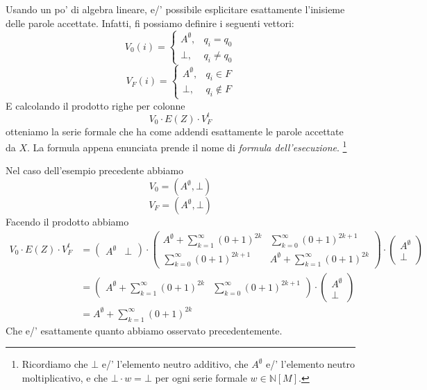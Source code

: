 Usando un po' di algebra lineare,
e/' possibile esplicitare esattamente l'inisieme delle parole accettate.
Infatti, fi possiamo definire i seguenti vettori:
\[
V_0(i)=
\left\{
\begin{matrix}
    A^\emptyset,  & q_i=q_0 
    \\
    \bot, & q_i\neq q_0 
\end{matrix}
\right.
\]
\[
V_F(i)=
\left\{
\begin{matrix}
    A^\emptyset,  & q_i \in F
    \\
    \bot, & q_i\notin F
\end{matrix}
\right.
\]
E calcolando il prodotto righe per colonne
\[
V_0 \cdot E(Z) \cdot V_F^t
\]
otteniamo la serie formale che ha come addendi esattamente le parole accettate da $X$.
La formula appena enunciata prende il nome di \textit{formula dell'esecuzione}.
\footnote{Ricordiamo che $\bot$ e/' l'elemento neutro additivo, 
che $A^\emptyset$ e/' l'elemento neutro moltiplicativo,
e che $\bot \cdot w = \bot$ per ogni serie formale $w \in \mathbb N[M]$.
}
\begin{exam}
    Nel caso dell'esempio precedente abbiamo
    \[
    V_0=(A^\emptyset, \bot)
    \]
    \[
    V_F=(A^\emptyset, \bot)
    \]
    Facendo il prodotto abbiamo
    \begin{align*}
        V_0 \cdot E(Z) \cdot V_F^t
        &=
        \begin{pmatrix}
              A^\emptyset & \bot    
        \end{pmatrix}
        \cdot 
        \begin{pmatrix}
        A^\emptyset + \sum_{k =1}^{\infty}(0+1)^{2k} & \sum_{k =0}^{\infty}(0+1)^{2k+1}
        \\
        \sum_{k =0}^{\infty}(0+1)^{2k+1} &  A^\emptyset + \sum_{k =1}^{\infty}(0+1)^{2k} 
    \end{pmatrix}
        \cdot
        \begin{pmatrix}
            A^\emptyset
            \\
            \bot
        \end{pmatrix}
        \\
        &=
        \begin{pmatrix}
            A^\emptyset + \sum_{k =1}^{\infty}(0+1)^{2k}
            &
            \sum_{k =0}^{\infty}(0+1)^{2k+1}
        \end{pmatrix}
        \cdot
        \begin{pmatrix}
            A^\emptyset
            \\
            \bot
        \end{pmatrix}
        \\&=
         A^\emptyset + \sum_{k =1}^{\infty}(0+1)^{2k}
    \end{align*}
    Che e/' esattamente quanto abbiamo osservato precedentemente.
\end{exam}

